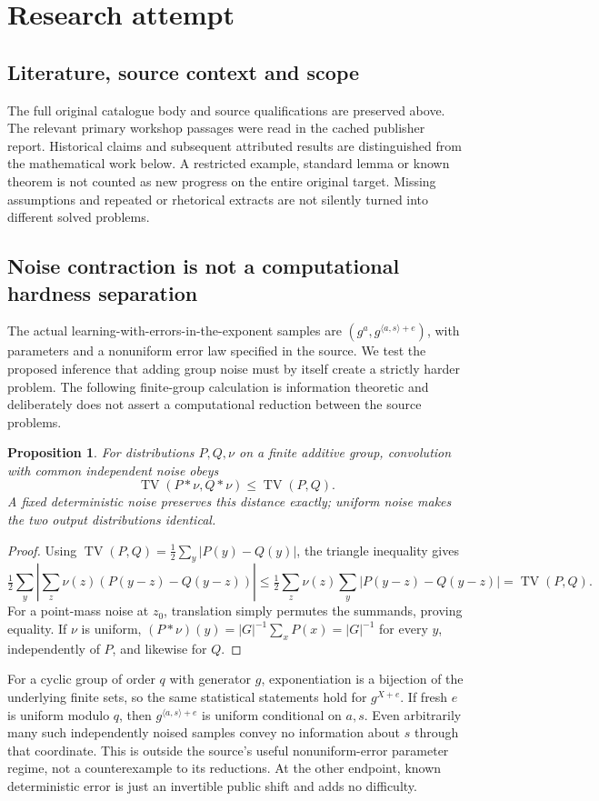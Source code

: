 \documentclass[11pt]{article}
\newtheorem{proposition}{Proposition}
\begin{document}
\section{Research attempt}
\subsection{Literature, source context and scope}
The full original catalogue body and source qualifications are preserved above. The relevant primary workshop passages were read in the cached publisher report. Historical claims and subsequent attributed results are distinguished from the mathematical work below. A restricted example, standard lemma or known theorem is not counted as new progress on the entire original target. Missing assumptions and repeated or rhetorical extracts are not silently turned into different solved problems.

\subsection{Noise contraction is not a computational hardness separation}
The actual learning-with-errors-in-the-exponent samples are $(g^a,g^{\langle a,s\rangle+e})$, with parameters and a nonuniform error law specified in the source. We test the proposed inference that adding group noise must by itself create a strictly harder problem. The following finite-group calculation is information theoretic and deliberately does not assert a computational reduction between the source problems.
\begin{proposition}
For distributions $P,Q,\nu$ on a finite additive group, convolution with common independent noise obeys
\[
\operatorname{TV}(P*\nu,Q*\nu)\le\operatorname{TV}(P,Q).
\]
A fixed deterministic noise preserves this distance exactly; uniform noise makes the two output distributions identical.
\end{proposition}
\begin{proof}
Using $\operatorname{TV}(P,Q)=\tfrac12\sum_y|P(y)-Q(y)|$, the triangle inequality gives
\[
\tfrac12\sum_y\left|\sum_z\nu(z)(P(y-z)-Q(y-z))\right|
\le\tfrac12\sum_z\nu(z)\sum_y|P(y-z)-Q(y-z)|
=\operatorname{TV}(P,Q).
\]
For a point-mass noise at $z_0$, translation simply permutes the summands, proving equality. If $\nu$ is uniform, $(P*\nu)(y)=|G|^{-1}\sum_xP(x)=|G|^{-1}$ for every $y$, independently of $P$, and likewise for $Q$.
\end{proof}
For a cyclic group of order $q$ with generator $g$, exponentiation is a bijection of the underlying finite sets, so the same statistical statements hold for $g^{X+e}$. If fresh $e$ is uniform modulo $q$, then $g^{\langle a,s\rangle+e}$ is uniform conditional on $a,s$. Even arbitrarily many such independently noised samples convey no information about $s$ through that coordinate. This is outside the source's useful nonuniform-error parameter regime, not a counterexample to its reductions. At the other endpoint, known deterministic error is just an invertible public shift and adds no difficulty.
\end{document}
